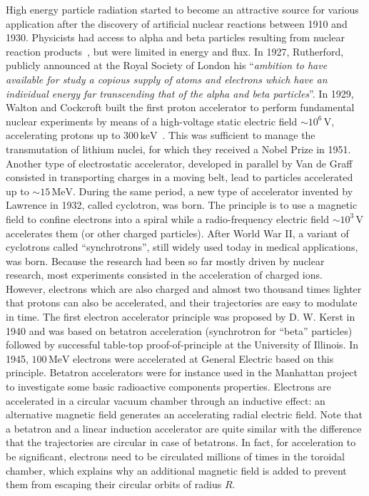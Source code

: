  High energy particle radiation started to become an attractive source for various application after the discovery of artificial nuclear reactions between 1910 and 1930. Physicists had access to alpha and beta particles resulting from nuclear reaction products~\cite{rutherford1916xliii}, but were limited in energy and flux. 
 In 1927, Rutherford, publicly announced at the Royal Society of London his ``\textit{ambition to have available for study a copious supply of atoms and electrons which have an individual energy far transcending that of the alpha and beta particles}”. 
 In 1929, Walton and Cockcroft built the first proton accelerator to perform fundamental nuclear experiments by means of a high-voltage static electric field $\sim 10^6\,\mathrm{V}$, accelerating protons up to $300\,\mathrm{keV}$~\cite{cockcroft1930experiments,cockcroft1932experiments}. This was sufficient to manage the transmutation of lithium nuclei, for which they received a Nobel Prize in 1951. Another type of electrostatic accelerator, developed in parallel by Van de Graff consisted in transporting charges in a moving belt, lead to particles accelerated up to $\sim 15\,\mathrm{MeV}$. During the same period, a new type of accelerator invented by Lawrence in 1932, called cyclotron, was born. The principle is to use a magnetic field to confine electrons into a spiral while a radio-frequency electric field $\sim 10^3\,\mathrm{V}$ accelerates them (or other charged particles). 
  After World War II, a variant of cyclotrons called ``synchrotrons'', still widely used today in medical applications, was born. Because the research had been so far mostly driven by nuclear research, most experiments consisted in the acceleration of charged ions. However, electrons which are also charged and almost two thousand times lighter that protons can also be accelerated, and their trajectories are easy to modulate in time. The first electron accelerator principle was proposed by D. W. Kerst in 1940 and was based on betatron acceleration (synchrotron for ``beta'' particles)~\cite{kerst1940acceleration} followed by successful table-top proof-of-principle at the University of Illinois. In 1945, $100\,\mathrm{MeV}$ electrons were accelerated at General Electric based on this principle. Betatron accelerators were for instance used in the Manhattan project to investigate some basic radioactive components properties. Electrons are accelerated in a circular vacuum chamber through an inductive effect: an alternative magnetic field generates an accelerating radial electric field. Note that a betatron and a linear induction accelerator are quite similar with the difference that the trajectories are circular in case of betatrons. In fact, for acceleration to be significant, electrons need to be circulated millions of times in the toroidal chamber, which explains why an additional magnetic field is added to prevent them from escaping their circular orbits of radius $R$.


